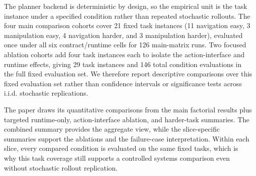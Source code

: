 The planner backend is deterministic by design, so the empirical unit is the
task instance under a specified condition rather than repeated stochastic
rollouts. The four main comparison cohorts cover 21 fixed task instances
(11 navigation easy, 3 manipulation easy, 4 navigation harder, and 3
manipulation harder), evaluated once under all six contract/runtime cells for
126 main-matrix runs. Two focused ablation cohorts add four task instances
each to isolate the action-interface and runtime effects, giving 29 task
instances and 146 total condition evaluations in the full fixed evaluation
set. We therefore report descriptive comparisons over this fixed evaluation
set rather than confidence intervals or significance tests across i.i.d.
stochastic replications.

The paper draws its quantitative comparisons from the main factorial results
plus targeted runtime-only, action-interface ablation, and harder-task
summaries. The combined summary provides the aggregate view, while the
slice-specific summaries support the ablations and the failure-case
interpretation. Within each slice, every compared condition is evaluated on the
same fixed tasks, which is why this task coverage still supports a controlled
systems comparison even without stochastic rollout replication.

